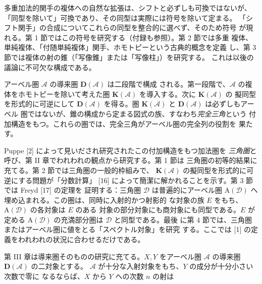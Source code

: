 \clearpage
{}
多重加法的関手の複体への自然な拡張は、シフトと必ずしも可換ではないが、
「同型を除いて」可換であり、その同型は実際には符号を除いて定まる。
「シフト関手」の合成についてこれらの同型を整合的に選べず、そのため符号
が現れる。第 1 節ではこの符号を研究する（付録も参照）。第 2 節では多重
複体、単純複体、「付随単純複体」関手、ホモトピーという古典的概念を定義
し、第 3 節では複体の射の錐（「写像錐」または「写像柱」）を研究する。
これは以後の議論に不可欠な構成である。

アーベル圏 $\mathcal A$ の導来圏 $\mathbf D(\mathcal A)$ は二段階で構成
される。第一段階で、$\mathcal A$ の複体をホモトピーを除いて考えた圏
$\mathbf K(\mathcal A)$ を導入する。次に $\mathbf K(\mathcal A)$ の
擬同型を形式的に可逆にして $\mathbf D(\mathcal A)$ を得る。圏
$\mathbf K(\mathcal A)$ と $\mathbf D(\mathcal A)$ は必ずしもアーベル
圏ではないが、錐の構成から定まる図式の族、すなわち\emph{完全三角}という
付加構造をもつ。これらの圏では、完全三角がアーベル圏の完全列の役割を
果たす。

Puppe [2] によって見いだされ研究されたこの付加構造をもつ加法圏を
\emph{三角圏}と呼び、第 II 章でわれわれの観点から研究する。第 1 節は
三角圏の初等的結果に充てる。第 2 節では三角圏の一般的枠組みで、
$\mathbf K(\mathcal A)$ の擬同型を形式的に可逆にする問題が「分数計算」
[16] によって簡潔に解かれることを示す。第 3 節では Freyd [17] の定理を
証明する：三角圏 $\mathcal D$ は普遍的にアーベル圏
$\mathrm A(\mathcal D)$ へ埋め込まれる。この圏は、同時に入射的かつ射影的
な対象の族 $E$ をもち、$\mathrm A(\mathcal D)$ の各対象は $E$ のある
対象の部分対象にも商対象にも同型である。$E$ が定める
$\mathrm A(\mathcal D)$ の充満部分圏は $\mathcal D$ と同型である。最後
に第 4 節では、三角圏またはアーベル圏に値をとる「スペクトル対象」を研究
する。ここでは [1] の定義をわれわれの状況に合わせるだけである。

第 III 章は導来圏そのものの研究に充てる。$X,Y$ をアーベル圏
$\mathcal A$ の導来圏 $\mathbf D(\mathcal A)$ の二対象とする。
$\mathcal A$ が十分な入射対象をもち、$Y$ の成分が十分小さい次数で零に
なるならば、$X$ から $Y$ への次数 $n$ の射は

